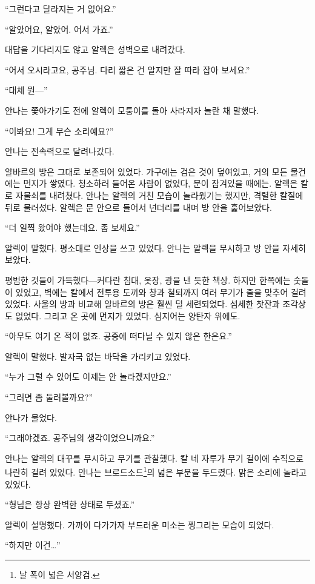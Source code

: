 ``그런다고 달라지는 거 없어요.''

``알았어요, 알았어. 어서 가죠.''

대답을 기다리지도 않고 알렉은 성벽으로 내려갔다.

``어서 오시라고요, 공주님. 다리 짧은 건 알지만 잘 따라 잡아 보세요.''

``대체 뭔—''

안나는 쫓아가기도 전에 알렉이 모퉁이를 돌아 사라지자 놀란 채 말했다.

``이봐요! 그게 무슨 소리예요?''

안나는 전속력으로 달려나갔다.

\textbreak

알바르의 방은 그대로 보존되어 있었다. 가구에는 검은 것이 덮여있고, 거의 모든 물건에는 먼지가 쌓였다. 청소하러 들어온 사람이 없었다, 문이 잠겨있을 때에는. 알렉은 칼로 자물쇠를 내려쳤다. 안나는 알렉의 거친 모습이 놀라웠기는 했지만, 격렬한 칼질에 뒤로 물러섰다. 알렉은 문 안으로 들어서 넌더리를 내며 방 안을 훑어보았다.

``더 일찍 왔어야 했는데요. 좀 보세요.''

알렉이 말했다. 평소대로 인상을 쓰고 있었다. 안나는 알렉을 무시하고 방 안을 자세히 보았다.

평범한 것들이 가득했다—커다란 침대, 옷장, 광을 낸 듯한 책상. 하지만 한쪽에는 숫돌이 있었고, 벽에는 칼에서 전투용 도끼와 창과 철퇴까지 여러 무기가 줄을 맞추어 걸려있었다. 사울의 방과 비교해 알바르의 방은 훨씬 덜 세련되었다. 섬세한 찻잔과 조각상도 없었다. 그리고 온 곳에 먼지가 있었다. 심지어는 양탄자 위에도.

``아무도 여기 온 적이 없죠. 공중에 떠다닐 수 있지 않은 한은요.''

알렉이 말했다. 발자국 없는 바닥을 가리키고 있었다.

``누가 그럴 수 있어도 이제는 안 놀라겠지만요.''

``그러면 좀 둘러볼까요?''

안나가 물었다.

``그래야겠죠. 공주님의 생각이었으니까요.''

안나는 알렉의 대꾸를 무시하고 무기를 관찰했다. 칼 네 자루가 무기 걸이에 수직으로 나란히 걸려 있었다. 안나는 브로드소드\footnote{날 폭이 넓은 서양검.}의 넓은 부분을 두드렸다. 맑은 소리에 놀라고 있었다.

``형님은 항상 완벽한 상태로 두셨죠.''

알렉이 설명했다. 가까이 다가가자 부드러운 미소는 찡그리는 모습이 되었다.

``하지만 이건\ldots''

